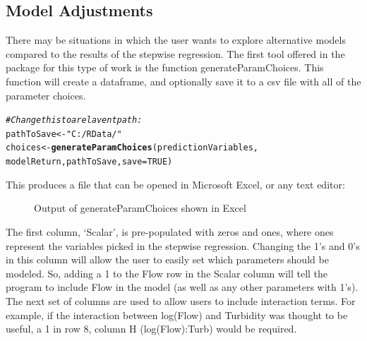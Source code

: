 \documentclass[a4paper,11pt]{article}\usepackage[]{graphicx}\usepackage[]{color}
\makeatletter
\newcommand{\hlnum}[1]{\textcolor[rgb]{0.686,0.059,0.569}{#1}}%
\newcommand{\hlstr}[1]{\textcolor[rgb]{0.192,0.494,0.8}{#1}}%
\newcommand{\hlcom}[1]{\textcolor[rgb]{0.678,0.584,0.686}{\textit{#1}}}%
\newcommand{\hlstd}[1]{\textcolor[rgb]{0.345,0.345,0.345}{#1}}%
\newcommand{\hlkwb}[1]{\textcolor[rgb]{0.69,0.353,0.396}{#1}}%
\newcommand{\hlkwc}[1]{\textcolor[rgb]{0.333,0.667,0.333}{#1}}%
\newcommand{\hlkwd}[1]{\textcolor[rgb]{0.737,0.353,0.396}{\textbf{#1}}}%
\newenvironment{kframe}{%
 \def\at@end@of@kframe{}%
 \ifinner\ifhmode%
  \def\at@end@of@kframe{\end{minipage}}%
  \begin{minipage}{\columnwidth}%
 \fi\fi%
 \def\FrameCommand##1{\hskip\@totalleftmargin \hskip-\fboxsep
 \colorbox{shadecolor}{##1}\hskip-\fboxsep
     \hskip-\linewidth \hskip-\@totalleftmargin \hskip\columnwidth}%
 \MakeFramed {\advance\hsize-\width
   \@totalleftmargin\z@ \linewidth\hsize
   \@setminipage}}%
 {\par\unskip\endMakeFramed%
 \at@end@of@kframe}
\newenvironment{knitrout}{}{} %
\makeatother
\begin{document}
\FloatBarrier

\subsection{Model Adjustments}
There may be situations in which the user wants to explore alternative models compared to the results of the stepwise regression. The first tool offered in the package for this type of work is the function generateParamChoices. This function will create a dataframe, and optionally save it to a csv file with all of the parameter choices.

\begin{knitrout}
\color{fgcolor}\begin{kframe}
\begin{alltt}
\hlcom{#Change this to a relavent path:}
\hlstd{pathToSave} \hlkwb{<-} \hlstr{"C:/RData/"}
\hlstd{choices} \hlkwb{<-} \hlkwd{generateParamChoices}\hlstd{(predictionVariables,}
                                \hlstd{modelReturn,pathToSave,}\hlkwc{save}\hlstd{=}\hlnum{TRUE}\hlstd{)}
\end{alltt}
\end{kframe}
\end{knitrout}





This produces a file that can be opened in Microsoft Excel, or any text editor:

\begin{figure}[ht!]
\centering
\caption{Output of generateParamChoices shown in Excel}
\label{overflow}
\end{figure}

The first column, `Scalar', is pre-populated with zeros and ones, where ones represent the variables picked in the stepwise regression. Changing the 1's and 0's in this column will allow the user to easily set which parameters should be modeled. So, adding a 1 to the Flow row in the Scalar column will tell the program to include Flow in the model (as well as any other parameters with 1's). The next set of columns are used to allow users to include interaction terms. For example, if the interaction between log(Flow) and Turbidity was thought to be useful, a 1 in row 8, column H (log(Flow):Turb) would be required.
\end{document}
